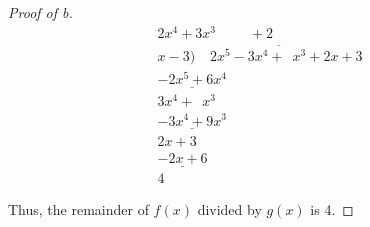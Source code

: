 \documentclass[../hw5]{subfiles}
\begin{document}
\begin{proof}[Proof of b]
	\[\begin{array}{r}
			2x^4+3x^3\phantom{+0x0}+2                                         \\
			x-3 \big) \overline{\phantom{aa}  2x^5-3x^4+\phantom{0} x^3+2x+3} \\
			\underline{-2x^5+6x^4}\phantom{+0x^3+0x+00}                       \\
			3x^4+\phantom{0}  x^3\phantom{+0x+00}                             \\
			\underline{-3x^4+9x^3}\phantom{+0x+00}                            \\
			2x+3                                                              \\
			\underline{-2x+6}                                                 \\
			4
		\end{array}\]

	Thus, the remainder of $f(x)$ divided by  $g(x)$ is 4.
\end{proof}
\end{document}
